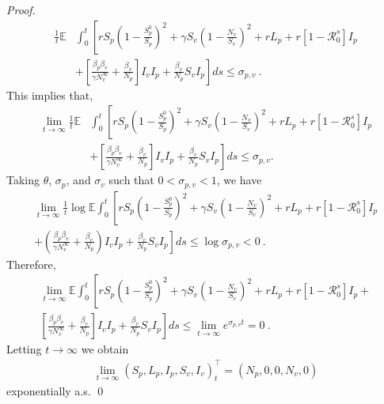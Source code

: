 \begin{proof}
\begin{align*}
		\frac{1}{t}
		\mathbb{E}
			&\int_{0}^{t}
				\left[
					rS_p 
					\left(
						1 - \frac{S_p^0}{S_p}
					\right) ^ 2 +
					\gamma S_v
					\left(
						1 - \frac{N_v}{S_v}
					\right) ^ 2 + 
					r L_p + 
					r 
					\left[
						1 - \mathcal{R} ^ s_ 0
					\right]I_p 
				\right.
			\\
			&+
				\left.
					\left[
						\frac{\beta_p \beta_v}{\gamma N ^ \infty_v} + 
						\frac{\beta_v}{N_p}
					\right] I_v I_p + 
					\frac{\beta_v}{N_p}S_vI_p
				\right] ds 
				\leq
				\sigma_{p,v} \ .
	\end{align*}
	This implies that,
	\begin{align*}
		\lim\limits_{t\to \infty}
		\frac{1}{t} \mathbb{E}
			&
			\int_{0}^{t}
			\left[
				r S_p
				\left(
					1 - 
					\frac{S_p^0}{S_p}
				\right) ^ 2 + 
				\gamma S_v
				\left(
					1 - \frac{N_v}{S_v}
				\right) ^ 2 + 
				r L_p + 
				r 
				\left[
					1 - \mathcal{R} ^ s _ 0
				\right] I_p 
			\right.
		\\
		&+
		\left.
			\left[
				\frac{\beta_p \beta_v}{\gamma N ^ \infty_v} + 
				\frac{\beta_v}{N_p}
			\right] I_v I_p + 
			\frac{\beta_v}{N_p}S_v I_p
		\right] ds 
		\leq 
		\sigma_{p,v}.
	\end{align*}
	Taking 
	$\theta$, $\sigma_p$, and $\sigma_v$ such that $0<\sigma_{p,v}< 1$, we 
	have
	\begin{multline*}
		\lim%
		\limits_{t\to \infty}
		\frac{1}{t}
		\log
		\mathbb{E}
		\int_{0} ^ {t}
			\left[
				r S_p
				\left(
					1-
					\frac{S_p ^ 0}{S_p}
				\right) ^ 2 +
			\right.
			\gamma S_v
			\left(
				1 - 
				\frac{N_v }{ S_v}
			\right) ^ 2 + 
			r L_p + r
			\left[
				1 - \mathcal{R}^s_0
			\right] I_p 
		\\
			 +
			\left(
				\frac{\beta_p\beta_v}{\gamma N^\infty_v} + 
				\frac{\beta_v}{N_p}
			\right) I_v I_p + 
			\left.
				\frac{\beta_v}{N_p} S_v I_p
			\right] 
			ds \leq 
			\log 
				\sigma_{p,v} <0 \ .
	\end{multline*}
	Therefore,
	\begin{multline*}
		\lim
		\limits_{t\to\infty}
		\mathbb{E}
			\int_{0} ^ {t}
		 		\left[ 
		 			r S_p
		 			\left(
		 				1 - 
		 				\frac{S_p^0}{S_p}
		 			\right)^ 2 +
		 		\right.
		 		\gamma S_v
		 		\left(
		 			1 - 
		 			\frac{N_v}{S_v}
		 		\right) ^ 2 + 	
				r L_p 
		 			+ 
		 			r
		 			\left[
		 				1 - \mathcal{R}^s_0
		 			\right] I_p 
				+
				\\
				\left.
					\left[
						\frac{\beta_p \beta_v}{\gamma N ^ \infty_v} + 
						\frac{\beta_v}{N_p}
					\right] I_v I_p + 
					\frac{\beta_v}{N_p} S_v I_p
				\right] 
				ds 
				\leq
				\lim
				\limits_{t\to \infty}
					e^{\sigma_{p,v} t } = 0 \ .
	\end{multline*}
Letting $t \to \infty$ we obtain
	\begin{align*}
		\lim\limits_{t \to\infty}
			(S_p, L_p, I_p, S_v, I_v )^{\top}_{t}
			=
			(N_p, 0, 0, N_v, 0)
	\end{align*}
		exponentially a.s. \qed
\end{proof}

